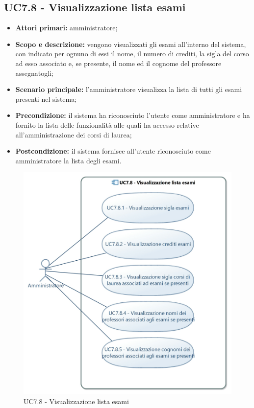 \documentclass[AnalisiDeiRequisiti.tex]{subfiles}
\begin{document}
\subsection{UC7.8 - Visualizzazione lista esami}
\begin{itemize}
	\item \textbf{Attori primari:} amministratore;
	\item \textbf{Scopo e descrizione:} vengono visualizzati gli esami all'interno del sistema, con indicato per ognuno di essi il nome, il numero di crediti, la sigla del corso ad esso associato e, se presente, il nome ed il cognome del professore assegnatogli;
	\item \textbf{Scenario principale:} l'amministratore visualizza la lista di tutti gli esami presenti nel sistema;
	\item \textbf{Precondizione:} il sistema ha riconosciuto l'utente come amministratore e ha fornito la lista delle funzionalità alle quali ha accesso relative all'amministrazione dei corsi di laurea;
	\item \textbf{Postcondizione:} il sistema fornisce all'utente riconosciuto come amministratore la lista degli esami.
\end{itemize}
\begin{figure}[H]
	\centering
	\includegraphics[width=0.7\linewidth]{UC7_8.jpg}
	\caption{UC7.8 - Visualizzazione lista esami}
	\label{fig:UC7.8 - Visualizzazione lista esami}
\end{figure}
\end{document}
